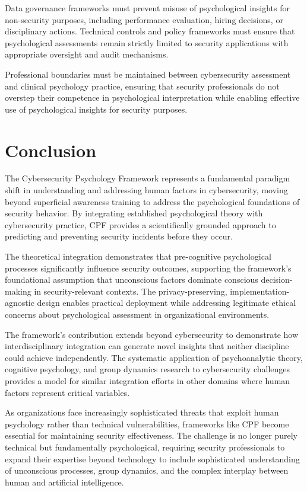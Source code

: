\documentclass[11pt,a4paper]{article}
\begin{document}
Data governance frameworks must prevent misuse of psychological insights for non-security purposes, including performance evaluation, hiring decisions, or disciplinary actions. Technical controls and policy frameworks must ensure that psychological assessments remain strictly limited to security applications with appropriate oversight and audit mechanisms.

Professional boundaries must be maintained between cybersecurity assessment and clinical psychology practice, ensuring that security professionals do not overstep their competence in psychological interpretation while enabling effective use of psychological insights for security purposes.

\section{Conclusion}

The Cybersecurity Psychology Framework represents a fundamental paradigm shift in understanding and addressing human factors in cybersecurity, moving beyond superficial awareness training to address the psychological foundations of security behavior. By integrating established psychological theory with cybersecurity practice, CPF provides a scientifically grounded approach to predicting and preventing security incidents before they occur.

The theoretical integration demonstrates that pre-cognitive psychological processes significantly influence security outcomes, supporting the framework's foundational assumption that unconscious factors dominate conscious decision-making in security-relevant contexts. The privacy-preserving, implementation-agnostic design enables practical deployment while addressing legitimate ethical concerns about psychological assessment in organizational environments.

The framework's contribution extends beyond cybersecurity to demonstrate how interdisciplinary integration can generate novel insights that neither discipline could achieve independently. The systematic application of psychoanalytic theory, cognitive psychology, and group dynamics research to cybersecurity challenges provides a model for similar integration efforts in other domains where human factors represent critical variables.

As organizations face increasingly sophisticated threats that exploit human psychology rather than technical vulnerabilities, frameworks like CPF become essential for maintaining security effectiveness. The challenge is no longer purely technical but fundamentally psychological, requiring security professionals to expand their expertise beyond technology to include sophisticated understanding of unconscious processes, group dynamics, and the complex interplay between human and artificial intelligence.
\end{document}
